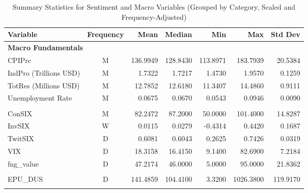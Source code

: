 \begin{table}[ht]
\centering
\scriptsize
\setlength{\tabcolsep}{4pt}
\begin{tabular}{lcrrrrr}
\toprule
Variable & Frequency & Mean & Median & Min & Max & Std Dev \\
\midrule
\multicolumn{7}{l}{\textbf{Macro Fundamentals}} \\
CPIPrc & M & 136.9949 & 128.8430 & 113.8971 & 183.7939 & 20.5384 \\
IndPro (Trillions USD) & M & 1.7322 & 1.7217 & 1.4730 & 1.9570 & 0.1259 \\
TotRes (Millions USD) & M & 12.7852 & 12.6180 & 11.3407 & 14.4860 & 0.9111 \\
Unemployment Rate & M & 0.0675 & 0.0670 & 0.0543 & 0.0946 & 0.0090 \\
\addlinespace
\multicolumn{7}{l}{\textbf{Sentiment}} \\
ConSIX & M & 82.2472 & 87.2000 & 50.0000 & 101.4000 & 14.8287 \\
InvSIX & W & 0.0115 & 0.0279 & -0.4314 & 0.4420 & 0.1687 \\
TwitSIX & D & 0.6081 & 0.6043 & 0.2625 & 0.7426 & 0.0319 \\
VIX & D & 18.3158 & 16.4150 & 9.1400 & 82.6900 & 7.2184 \\
fng_value & D & 47.2174 & 46.0000 & 5.0000 & 95.0000 & 21.8362 \\
\addlinespace
\multicolumn{7}{l}{\textbf{Uncertainty}} \\
EPU_DUS & D & 141.4859 & 104.4100 & 3.3200 & 1026.3800 & 119.9170 \\
\addlinespace
\bottomrule
\end{tabular}
\caption{Summary Statistics for Sentiment and Macro Variables (Grouped by Category, Scaled and Frequency-Adjusted)}
\label{tab:macro_stat_summary}
\end{table}
